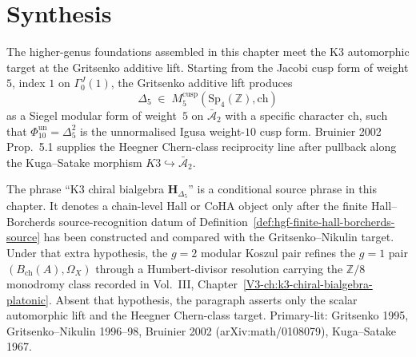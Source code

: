 
\section{Synthesis}
\label{sec:hgfnd-supplement}

\begin{remark}
\label{rem:hgfnd-1}
The higher-genus foundations assembled in this chapter meet the K3
automorphic target at the Gritsenko additive lift. Starting from the
Jacobi cusp form of weight $5$, index $1$ on $\Gamma^J_0(1)$, the
Gritsenko additive lift produces
\[
\Delta_5 \;\in\; M_5^{\mathrm{cusp}}(\mathrm{Sp}_4(\mathbb Z),\mathrm{ch})
\]
as a Siegel modular form of weight~$5$ on $\bar{\mathcal A}_2$ with a
specific character $\mathrm{ch}$, such that
$\Phi_{10}^{\mathrm{un}}=\Delta_5^2$ is the unnormalised Igusa
weight-$10$ cusp form. Bruinier 2002 Prop.~5.1 supplies the
Heegner Chern-class reciprocity line after pullback along the
Kuga--Satake morphism $K3\hookrightarrow\bar{\mathcal A}_2$.

The phrase ``K3 chiral bialgebra $\mathbf H_{\Delta_5}$'' is a
conditional source phrase in this chapter. It denotes a chain-level
Hall or CoHA object only after the finite Hall--Borcherds
source-recognition datum of
Definition~\ref{def:hgf-finite-hall-borcherds-source} has been
constructed and compared with the Gritsenko--Nikulin target. Under
that extra hypothesis, the $g=2$ modular Koszul pair refines the
$g=1$ pair $(B_{\mathrm{ch}}(A),\Omega_X)$ through a
Humbert-divisor resolution carrying the $\mathbb Z/8$ monodromy
class recorded in Vol.~III, Chapter~\ref{V3-ch:k3-chiral-bialgebra-platonic}.
Absent that hypothesis, the paragraph asserts only the scalar
automorphic lift and the Heegner Chern-class target.
Primary-lit: Gritsenko 1995, Gritsenko--Nikulin 1996--98, Bruinier 2002
(arXiv:math/0108079), Kuga--Satake 1967.
\end{remark}

